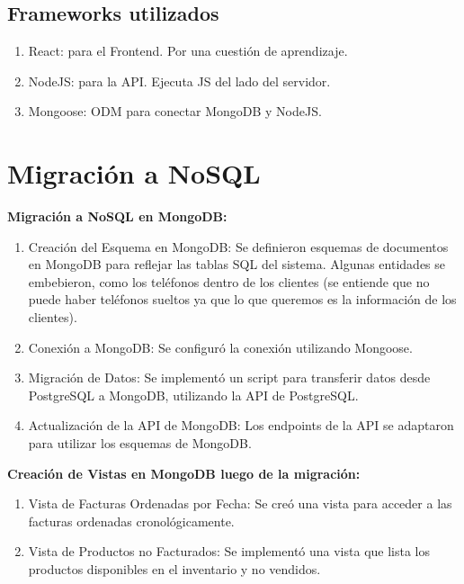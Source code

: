 \documentclass[a4paper,12pt]{article}
\begin{document}
	\subsection {Frameworks utilizados}
	
	\begin{enumerate}
		\item React: para el Frontend. Por una cuestión de aprendizaje.
		\item NodeJS: para la API. Ejecuta JS del lado del servidor.
		\item Mongoose: ODM para conectar MongoDB y NodeJS.
	\end{enumerate}
	
	\newpage
	
	\section{Migración a NoSQL}
	
	\textbf{Migración a NoSQL en MongoDB:}
	
		\begin{enumerate}
			
		\item Creación del Esquema en MongoDB: Se definieron esquemas de documentos en MongoDB para reflejar las tablas SQL del sistema. Algunas entidades se embebieron, como los teléfonos dentro de los clientes (se entiende que no puede haber teléfonos sueltos ya que lo que queremos es la información de los clientes).
		
		\item Conexión a MongoDB: Se configuró la conexión utilizando Mongoose.
		
		\item Migración de Datos: Se implementó un script para transferir datos desde PostgreSQL a MongoDB, utilizando la API de PostgreSQL.
		
		\item Actualización de la API de MongoDB: Los endpoints de la API se adaptaron para utilizar los esquemas de MongoDB.
		
		\end{enumerate}

	\textbf{Creación de Vistas en MongoDB luego de la migración:}
	
		\begin{enumerate}
			
		\item Vista de Facturas Ordenadas por Fecha: Se creó una vista para acceder a las facturas ordenadas cronológicamente.
		
		\item Vista de Productos no Facturados: Se implementó una vista que lista los productos disponibles en el inventario y no vendidos.
		
		\end{enumerate}
	
\end{document}
